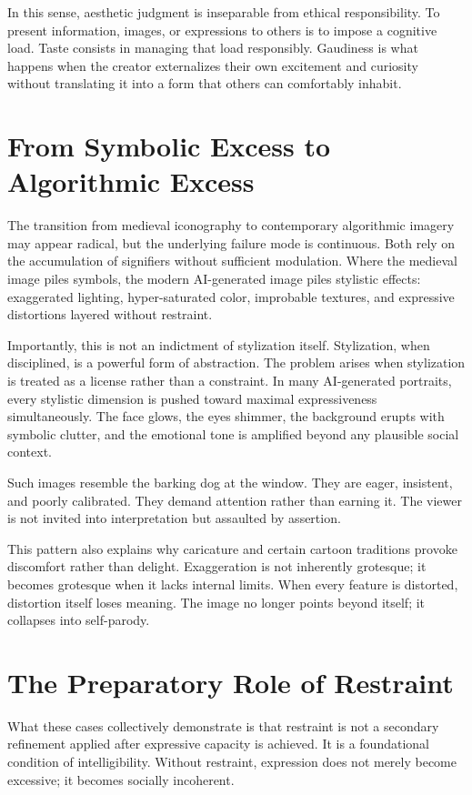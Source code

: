 \documentclass[12pt]{article}
\begin{document}
In this sense, aesthetic judgment is inseparable from ethical responsibility. To present information, images, or expressions to others is to impose a cognitive load. Taste consists in managing that load responsibly. Gaudiness is what happens when the creator externalizes their own excitement and curiosity without translating it into a form that others can comfortably inhabit.

\section{From Symbolic Excess to Algorithmic Excess}

The transition from medieval iconography to contemporary algorithmic imagery may appear radical, but the underlying failure mode is continuous. Both rely on the accumulation of signifiers without sufficient modulation. Where the medieval image piles symbols, the modern AI-generated image piles stylistic effects: exaggerated lighting, hyper-saturated color, improbable textures, and expressive distortions layered without restraint.

Importantly, this is not an indictment of stylization itself. Stylization, when disciplined, is a powerful form of abstraction. The problem arises when stylization is treated as a license rather than a constraint. In many AI-generated portraits, every stylistic dimension is pushed toward maximal expressiveness simultaneously. The face glows, the eyes shimmer, the background erupts with symbolic clutter, and the emotional tone is amplified beyond any plausible social context.

Such images resemble the barking dog at the window. They are eager, insistent, and poorly calibrated. They demand attention rather than earning it. The viewer is not invited into interpretation but assaulted by assertion.

This pattern also explains why caricature and certain cartoon traditions provoke discomfort rather than delight. Exaggeration is not inherently grotesque; it becomes grotesque when it lacks internal limits. When every feature is distorted, distortion itself loses meaning. The image no longer points beyond itself; it collapses into self-parody.

\section{The Preparatory Role of Restraint}

What these cases collectively demonstrate is that restraint is not a secondary refinement applied after expressive capacity is achieved. It is a foundational condition of intelligibility. Without restraint, expression does not merely become excessive; it becomes socially incoherent.
\end{document}
